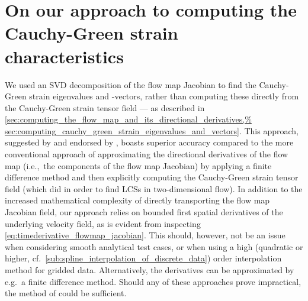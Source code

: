 \section[On our approach to computing the Cauchy-Green
strain characteristics] {On our approach to computing the%
    \\\phantom{5.1} Cauchy-Green strain characteristics}
\label{sec:on_our_approach_to_computing_the_cauchy_green%
_strain_characteristics}

We used an SVD decomposition of the flow map Jacobian to find the Cauchy-Green
strain eigenvalues and -vectors, rather than computing these directly from the
Cauchy-Green strain tensor field --- as described in
\cref{sec:computing_the_flow_map_and_its_directional_derivatives,%
sec:computing_cauchy_green_strain_eigenvalues_and_vectors}. This approach,
suggested by \textcite{miron2012anisotropic} and endorsed by
\textcite{oettinger2016autonomous}, boasts superior accuracy compared to the
more conventional approach of approximating the directional derivatives of the
flow map (i.e.,\ the components of the flow map Jacobian) by applying a finite
difference method and then explicitly computing the Cauchy-Green strain
tensor field (which \textcite{farazmand2012computing} did in order to find LCSs
in two-dimensional flow). In addition to the increased mathematical complexity
of directly transporting the flow map Jacobian field, our approach relies on
bounded first spatial derivatives of the underlying velocity field, as is
evident from inspecting \cref{eq:timederivative_flowmap_jacobian}. This should,
however, not be an issue when considering smooth analytical test cases, or when
using a high (quadratic or higher, cf.\
\cref{sub:spline_interpolation_of_discrete_data}) order interpolation method
for gridded data. Alternatively, the derivatives can be approximated by e.g.\ a
finite difference method. Should any of these approaches prove impractical, the
method of \textcite{farazmand2012computing} could be sufficient.

